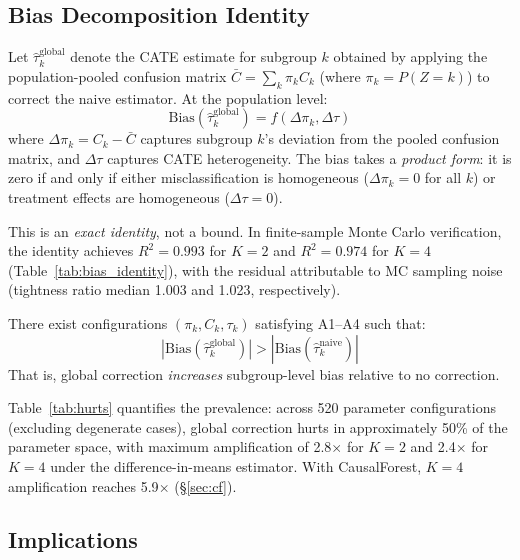 \documentclass[11pt,a4paper]{article}
\newcommand{\DeltaPi}{\Delta\pi}
\newcommand{\DeltaTau}{\Delta\tau}
\begin{document}
\subsection{Bias Decomposition Identity}

\begin{theorem}\label{thm:bias}
Let $\hat{\tau}_k^{\text{global}}$ denote the CATE estimate for subgroup $k$ obtained by applying the population-pooled confusion matrix $\bar{C} = \sum_k \pi_k C_k$ (where $\pi_k = P(Z=k)$) to correct the naive estimator.
At the population level:
\begin{equation}\label{eq:bias}
\text{Bias}(\hat{\tau}_k^{\text{global}}) = f(\DeltaPi_k, \DeltaTau)
\end{equation}
where $\DeltaPi_k = C_k - \bar{C}$ captures subgroup $k$'s deviation from the pooled confusion matrix, and $\DeltaTau$ captures CATE heterogeneity.
The bias takes a \emph{product form}: it is zero if and only if either misclassification is homogeneous ($\DeltaPi_k = 0$ for all $k$) or treatment effects are homogeneous ($\DeltaTau = 0$).
\end{theorem}

This is an \emph{exact identity}, not a bound.
In finite-sample Monte Carlo verification, the identity achieves $R^2 = 0.993$ for $K = 2$ and $R^2 = 0.974$ for $K = 4$ (Table~\ref{tab:bias_identity}), with the residual attributable to MC sampling noise (tightness ratio median 1.003 and 1.023, respectively).

\begin{proposition}\label{prop:hurts}
There exist configurations $(\pi_k, C_k, \tau_k)$ satisfying A1--A4 such that:
\begin{equation}
|\text{Bias}(\hat{\tau}_k^{\text{global}})| > |\text{Bias}(\hat{\tau}_k^{\text{naive}})|
\end{equation}
That is, global correction \emph{increases} subgroup-level bias relative to no correction.
\end{proposition}

Table~\ref{tab:hurts} quantifies the prevalence: across 520 parameter configurations (excluding degenerate cases), global correction hurts in approximately 50\% of the parameter space, with maximum amplification of 2.8$\times$ for $K=2$ and 2.4$\times$ for $K=4$ under the difference-in-means estimator.
With CausalForest, $K=4$ amplification reaches 5.9$\times$ (\S\ref{sec:cf}).


\subsection{Implications}
\end{document}

